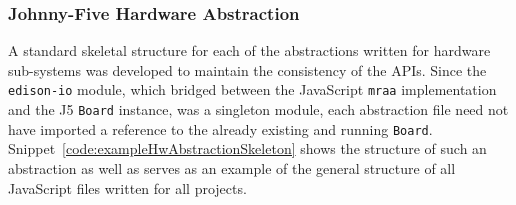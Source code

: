     \subsubsection{Johnny-Five Hardware Abstraction}
      A standard skeletal structure for each of the abstractions written for hardware sub-systems was developed to maintain the consistency of the APIs. Since the \texttt{edison-io} module, which bridged between the JavaScript \texttt{mraa} implementation and the J5 \texttt{Board} instance, was a singleton module, each abstraction file need not have imported a reference to the already existing and running \texttt{Board}. Snippet~\ref{code:exampleHwAbstractionSkeleton} shows the structure of such an abstraction as well as serves as an example of the general structure of all JavaScript files written for all projects.
      
